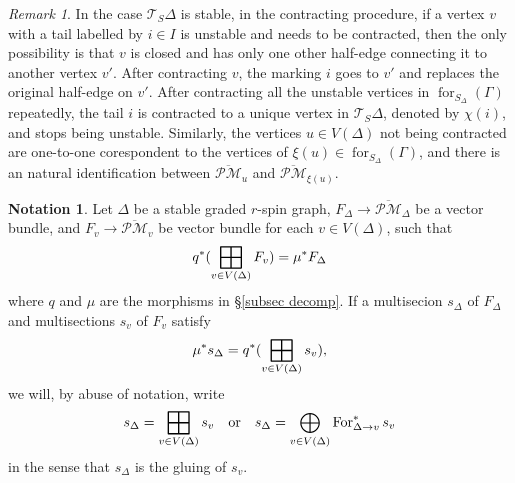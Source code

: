 \documentclass[11pt]{amsart}
\theoremstyle{definition}
\newtheorem{nn}[dummy]{Notation}
\theoremstyle{remark}
\newtheorem{rmk}[dummy]{Remark}
\newcommand{\oPMb}{{\overline{\mathcal{PM}}}}
\newcommand{\<}{\left<}
\renewcommand{\>}{\right>}
\numberwithin{equation}{section}
\DeclareMathOperator*{\bboxplus}{\scalerel*{\boxplus}{\sum}}
\begin{document}
    \begin{rmk}\label{rmk on contract after forget}
    In the case $\mathcal T_S \Delta$ is stable, in the contracting procedure, if a vertex $v$ with a tail labelled by $i\in I$ is unstable and needs to be contracted, then the only possibility is that $v$ is closed and has only one other half-edge connecting it to another vertex $v'$. After contracting $v$, the marking $i$ goes to $v'$ and replaces the original half-edge on $v'$. After contracting all the unstable vertices in $\operatorname{for}_{S_{\Delta}}(\Gamma)$ repeatedly,  the tail $i$ is contracted to a unique vertex in $\mathcal T_S \Delta$, denoted by $\chi(i)$,  and stops being unstable. Similarly, the vertices $u\in V(\Delta)$ not being contracted are one-to-one corespondent to the vertices of  $\xi(u) \in \operatorname{for}_{S_{\Delta}}(\Gamma)$, and there is an natural identification between $\oPMb_u$ and $\oPMb_{\xi(u)}$.
    \end{rmk}

    \begin{nn}\label{nn bad notation}
        Let $\Delta$ be a stable graded $r$-spin graph, $F_\Delta\to \oPMb_\Delta$ be a vector bundle, and $F_v\to \oPMb_v$ be vector bundle for each $v\in V(\Delta)$, such that 
        $$
        q^*(\bboxplus_{v\in V(\Delta)}F_v)=\mu^* F_\Delta
        $$
        where $q$ and $\mu$ are the morphisms in \S\ref{subsec decomp}. If a multisecion $s_\Delta$ of $F_\Delta$ and multisections $s_v$ of $F_v$ satisfy
        $$
        \mu^* s_\Delta=q^*(\bboxplus_{v\in V(\Delta)}s_v),
        $$
        we will, by abuse of notation, write
        $$
        s_\Delta=\bboxplus_{v\in V(\Delta)}s_v\quad \text{or} \quad s_\Delta=\bigoplus_{v\in V(\Delta)} \operatorname{For}^*_{\Delta \to v} s_v
        $$
        in the sense that $s_\Delta$ is the gluing of $s_v$.
    \end{nn}
    
\end{document}
